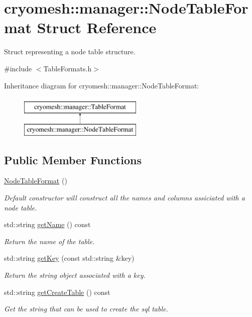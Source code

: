 \hypertarget{structcryomesh_1_1manager_1_1NodeTableFormat}{\section{cryomesh\-:\-:manager\-:\-:\-Node\-Table\-Format \-Struct \-Reference}
\label{structcryomesh_1_1manager_1_1NodeTableFormat}
}


\-Struct representing a node table structure.  




{\ttfamily \#include $<$\-Table\-Formats.\-h$>$}

\-Inheritance diagram for cryomesh\-:\-:manager\-:\-:\-Node\-Table\-Format\-:\begin{figure}[H]
\begin{center}
\leavevmode
\includegraphics[height=2.000000cm]{structcryomesh_1_1manager_1_1NodeTableFormat}
\end{center}
\end{figure}
\subsection*{\-Public \-Member \-Functions}
\begin{DoxyCompactItemize}
\item 
\hyperlink{structcryomesh_1_1manager_1_1NodeTableFormat_a3fc3590dfb2aaca8658db8f66ca7b5e8}{\-Node\-Table\-Format} ()
\begin{DoxyCompactList}\small\item\em \-Default constructor will construct all the names and columns assiciated with a node table. \end{DoxyCompactList}\item 
std\-::string \hyperlink{structcryomesh_1_1manager_1_1TableFormat_a3e797d6130c6b0745a1fac799c25677a}{get\-Name} () const 
\begin{DoxyCompactList}\small\item\em \-Return the name of the table. \end{DoxyCompactList}\item 
std\-::string \hyperlink{structcryomesh_1_1manager_1_1TableFormat_a2256ce39471582b92bf7cbb6eec74d30}{get\-Key} (const std\-::string \&key)
\begin{DoxyCompactList}\small\item\em \-Return the string object associated with a key. \end{DoxyCompactList}\item 
std\-::string \hyperlink{structcryomesh_1_1manager_1_1TableFormat_a898ae0d0c5490ccdf71aec5156b10fcc}{get\-Create\-Table} () const 
\begin{DoxyCompactList}\small\item\em \-Get the string that can be used to create the sql table. \end{DoxyCompactList}\end{DoxyCompactItemize}
